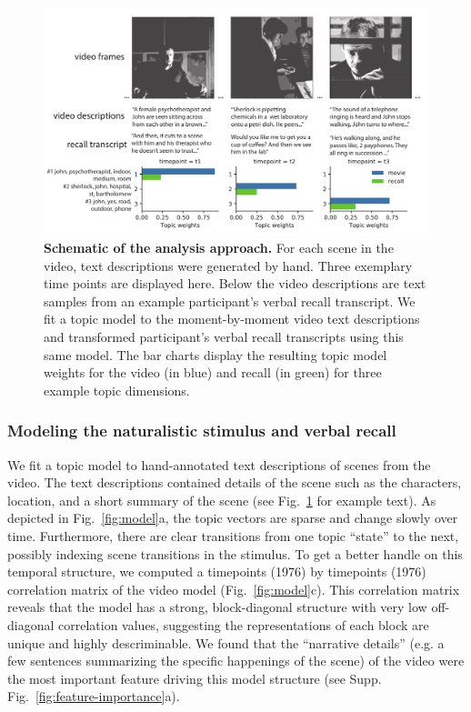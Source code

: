 \documentclass{article}
\begin{document}
\begin{figure}[th!]
\centering
\includegraphics[width=1\textwidth]{figs/1_analysis_schematic_bw.pdf}
\caption{\small \textbf{Schematic of the analysis approach.} For each scene in the video, text descriptions were generated by hand. Three exemplary time points are displayed here.  Below the video descriptions are text samples from an example participant's verbal recall transcript.  We fit a topic model to the moment-by-moment video text descriptions and transformed participant's verbal recall transcripts using this same model. The bar charts display the resulting topic model weights for the video (in blue) and recall (in green) for three example topic dimensions.}
\label{fig:schematic}
\end{figure}

\subsubsection{Modeling the naturalistic stimulus and verbal recall}
We fit a topic model \citep{BleiEtal03} to hand-annotated text descriptions of scenes from the video. The text descriptions contained details of the scene such as the characters, location, and a short summary of the scene (see Fig.~\ref{fig:schematic} for example text). As depicted in Fig.~\ref{fig:model}a, the topic vectors are sparse and change slowly over time. Furthermore, there are clear transitions from one topic ``state'' to the next, possibly indexing scene transitions in the stimulus. To get a better handle on this temporal structure, we computed a timepoints (1976) by timepoints (1976) correlation matrix of the video model (Fig.~\ref{fig:model}c).  This correlation matrix reveals that the model has a strong, block-diagonal structure with very low off-diagonal correlation values, suggesting the representations of each block are unique and highly descriminable. We found that the ``narrative details'' (e.g. a few sentences summarizing the specific happenings of the scene) of the video were the most important feature driving this model structure (see Supp. Fig.~\ref{fig:feature-importance}a).
\end{document}

